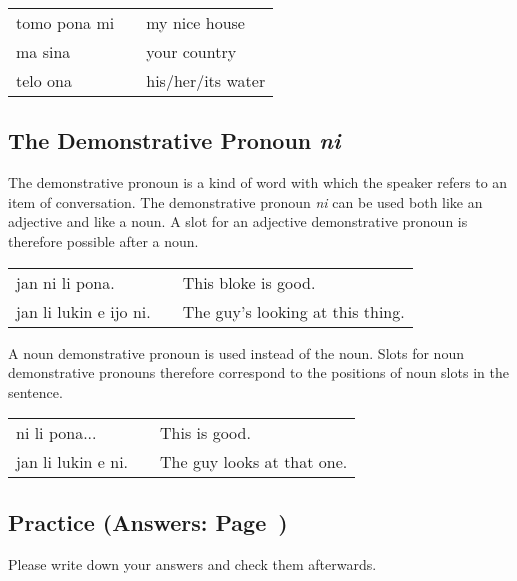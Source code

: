 \begin{supertabular}{p{5,5cm}|ll}
tomo pona mi && my nice house \\
ma sina && your country \\
telo ona && his/her/its water \\
\end{supertabular} 

%
\subsection*{The Demonstrative Pronoun \textit{ni}}
%

The demonstrative pronoun is a kind of word with which the speaker refers to an  item of conversation. 
The demonstrative pronoun \textit{ni} can be used both like an adjective and like a noun.  
A slot for an adjective demonstrative pronoun is therefore possible after a noun. 

\begin{supertabular}{p{5,5cm}|ll}
jan ni li pona. && This bloke is good. \\
jan li lukin e ijo ni. && The guy's looking at this thing. \\
\end{supertabular}

A noun demonstrative pronoun is used instead of the noun. 
Slots for noun demonstrative pronouns therefore correspond to the positions of noun slots in the sentence. 

\begin{supertabular}{p{5,5cm}|ll}
ni li pona... && This is good. \\
jan li lukin e ni. && The guy looks at that one. \\
\end{supertabular}

\newpage
\subsection*{Practice (Answers: Page~\pageref{'adjectives'})}

Please write down your answers and check them afterwards. 

